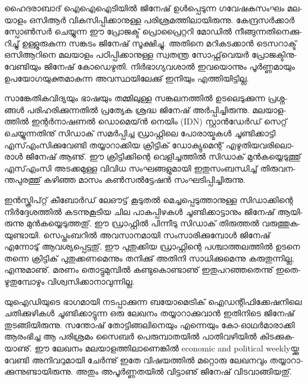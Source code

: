 ഹൈ­ദ­രാ­ബാ­ദ് ഐഐ­ഐ­ടി­യില്‍ ജി­നേ­ഷ് ഉള്‍­പ്പെ­ടു­ന്ന ഗവേ­ഷ­ക­സം­ഘം മല­യാ­ളം ഒ­സി­ആര്‍ വി­ക­സി­പ്പി­ക്കാ­നു­ള്ള 
പരി­ശ്ര­മ­ത്തി­ലാ­യി­രു­ന്നു. കേ­ന്ദ്ര­സര്‍­ക്കാര്‍ സ്പോണ്‍­സര്‍ ചെ­യ്യു­ന്ന ഈ പ്രോ­ജ­ക്ട് പ്രൊ­പ്രൈ­റ്റ­റി മോ­ഡില്‍ നീ­ങ്ങു­ന്ന­തി­നെ­ക്കു­റി­ച്ചു് 
ഉള്ളു­രു­കു­ന്ന സങ്ക­ടം ജി­നേ­ഷ് സൂ­ക്ഷി­ച്ചു. അതി­നെ മറി­ക­ട­ക്കാന്‍ ടെ­സ­റാ­ക്ട് ഒസി­ആ­റി­നെ മല­യാ­ളം പഠി­പ്പി­ക്കാ­നു­ള്ള സ്വ­ത­ന്ത്ര 
സോ­ഫ്റ്റ്‌­വെ­യര്‍ പ്രോ­ജ­ക്ടി­നു­വേ­ണ്ടി­യും ജി­നേ­ഷ് കോ­ഡെ­ഴു­തി. നിര്‍­ഭാ­ഗ്യ­വ­ശാല്‍ ഇവ­യൊ­ന്നും പൂര്‍­ണ്ണ­മാ­യും 
ഉപ­യോ­ഗ­യു­ക്ത­മാ­കു­ന്ന അവ­സ്ഥ­യി­ലേ­ക്കു് ഇനി­യും എത്തി­യി­ട്ടി­ല്ല.

­സാ­ങ്കേ­തി­ക­വി­ദ്യ­യും ഭാ­ഷ­യും തമ്മി­ലു­ള്ള സങ്ക­ല­ന­ത്തില്‍ ഉട­ലെ­ടു­ക്കു­ന്ന പ്ര­ശ്ന­ങ്ങള്‍ പരി­ഹ­രി­ക്കു­ന്ന­തില്‍ പ്ര­ത്യേക ശ്ര­ദ്ധ ജി­നേ­ഷ് 
അര്‍­പ്പി­ച്ചി­രു­ന്നു. മല­യാ­ള­ത്തില്‍ ഇന്റര്‍­നാ­ഷ­ണല്‍ ഡൊ­മെ­യ്ന്‍ നെ­യിം (IDN) സ്റ്റാന്‍­ഡേര്‍­ഡ് സെ­റ്റ് ചെ­യ്യു­ന്ന­തി­നു് സി­ഡാ­ക്‍ 
സമര്‍­പ്പി­ച്ച ഡ്രാ­ഫ്റ്റി­ലെ പോ­രാ­യ്മ­കള്‍ ചൂ­ണ്ടി­ക്കാ­ട്ടി എസ്എം­സി­ക്കു­വേ­ണ്ടി തയ്യാ­റാ­ക്കിയ ക്രി­ട്ടി­ക്‍ ഡോ­ക്യു­മെ­ന്റ് 
എഴു­തി­യ­വ­രി­ലൊ­രാള്‍ ജി­നേ­ഷ് ആണു്. ഈ ക്രി­ട്ടി­ക്കി­ന്റെ വെ­ളി­ച്ച­ത്തില്‍ സി­ഡാ­ക്‍ മുന്‍­ക­യ്യെ­ടു­ത്തു് എസ്എം­സി അട­ക്ക­മു­ള്ള 
വി­വിധ സം­ഘ­ങ്ങ­ളു­മാ­യി ഇതു­സം­ബ­ന്ധി­ച്ച് തി­രു­വ­ന­ന്ത­പു­ര­ത്തു് കഴി­ഞ്ഞ മാ­സം കണ്‍­സല്‍­ട്ടേ­ഷന്‍ സം­ഘ­ടി­പ്പി­ച്ചി­രു­ന്നു­.

ഇന്‍­സ്ക്രി­പ്റ്റ് കീ­ബോര്‍­ഡ് ലേ­ഔ­ട്ട് കൂ­ടു­തല്‍ മെ­ച്ച­പ്പെ­ടു­ത്താ­നു­ള്ള സി­ഡാ­ക്കി­ന്റെ നിര്‍­ദ്ദേ­ശ­ത്തില്‍ കട­ന്നു­കൂ­ടിയ ചില പാ­ക­പ്പി­ഴ­കള്‍ 
ചൂ­ണ്ടി­ക്കാ­ട്ടാ­നും ജി­നേ­ഷ് ആയി­രു­ന്നു മുന്‍­ക­യ്യെ­ടു­ത്ത­തു്. ഈ ഡ്രാ­ഫ്റ്റില്‍ പി­ന്നീ­ടു സി­ഡാ­ക്‍ തി­രു­ത്തല്‍ വരു­ത്തു­ക­യു­ണ്ടാ­യി. 
സെ­പ്തം­ബ­റില്‍ അവ­സാ­ന­മാ­യി സം­സാ­രി­ക്കു­മ്പോള്‍ ജി­നേ­ഷ് എന്നോ­ടു് ആവ­ശ്യ­പ്പെ­ട്ട­തു്, ഈ പു­തു­ക്കിയ ഡ്രാ­ഫ്റ്റി­ന്റെ 
പശ്ചാ­ത്ത­ല­ത്തില്‍ ഉട­നെ തന്നെ ക്രി­ട്ടി­ക്‍ പു­തു­ക്ക­ണ­മെ­ന്നും തനി­ക്കു് അതി­നി സാ­ധി­ക്കു­മെ­ന്നു കരു­തു­ന്നി­ല്ല, എന്നു­മാ­ണു്. ­മ­ര­ണം­ 
തൊ­ട്ടു­മു­മ്പില്‍ കണ്ടു­കൊ­ണ്ടാ­ണു് ഇതു­പ­റ­ഞ്ഞ­തെ­ന്നു് ഇതെ­ഴു­തു­മ്പോ­ഴും വി­ശ്വ­സി­ക്കാ­നാ­വു­ന്നി­ല്ല.

­യു­ഐ­ഡി­യു­ടെ ഭാ­ഗ­മാ­യി നട­പ്പാ­ക്കു­ന്ന ബയോ­മെ­ട്രി­ക്‍ ഐഡ­ന്റി­ഫി­ക്കേ­ഷ­നി­ലെ ചതി­ക്കു­ഴി­കള്‍ ചൂ­ണ്ടി­ക്കാ­ട്ടു­ന്ന ഒരു ലേ­ഖ­നം 
തയ്യാ­റാ­ക്കു­വാന്‍ ഇതി­നി­ടെ ജി­നേ­ഷ് തു­ട­ങ്ങി­യി­രു­ന്നു. സന്തോ­ഷ് തോ­ട്ടി­ങ്ങ­ലി­നെ­യും എന്നെ­യും കോ-ഓഥര്‍­മാ­രാ­ക്കി ആരം­ഭി­ച്ച 
ആ പരി­ശ്ര­മം സൈ­ബര്‍ പെ­രു­മ്പാ­ത­യില്‍ പാ­തി­വ­ഴി­യില്‍ കി­ട­ക്കു­ക­യാ­ണു്. ഈ ലേ­ഖ­നം മല­യാ­ള­ത്തി­ലാ­ണെ­ങ്കില്‍ 
economic and political weekly­യ്ക്കു വേ­ണ്ടി അനി­വ­റു­മാ­യി ചേര്‍­ന്നു് ഇതേ വി­ഷ­യ­ത്തില്‍ മറ്റൊ­രു ലേ­ഖ­ന­വും 
തയ്യാ­റാ­ക്കു­ന്നു­ണ്ടാ­യി­രു­ന്നു. അതും അപൂര്‍­ണ്ണ­ത­യില്‍ വി­ട്ടാ­ണു് ജി­നേ­ഷ് വി­ട­വാ­ങ്ങി­യ­തു്.

